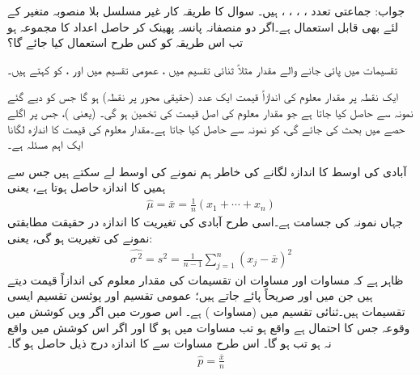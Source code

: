جواب:\quad
جماعتی تعدد ، ، ، ،  ہیں۔
\quad
سوال  کا طریقہ کار غیر مسلسل بلا منصوبہ متغیر کے لئے  بھی قابل استعمال ہے۔اگر دو منصفانہ پانسہ پھینک کر حاصل اعداد کا مجموعہ  ہو تب اس طریقہ کو کس طرح استعمال کیا جائے گا؟

تقسیمات میں پائی جانے والے مقدار مثلاً ثنائی تقسیم میں ، عمومی تقسیم میں  اور ، کو  کہتے ہیں۔

ایک نقطہ پر مقدار معلوم کی اندازاً قیمت  ایک عدد (حقیقی محور پر نقطہ) ہو گا جس کو دیے گئے نمونہ سے حاصل کیا جاتا ہے جو مقدار معلوم کی اصل قیمت کی تخمین ہو گی۔  (یعنی )، جس پر اگلے حصے میں بحث کی جائے گی،  کو نمونہ سے حاصل کیا جاتا ہے۔مقدار معلوم کی قیمت کا اندازہ لگانا ایک اہم مسئلہ ہے۔

آبادی کی اوسط   کا اندازہ لگانے کی خاطر ہم نمونے کی اوسط  لے سکتے ہیں جس سے ہمیں  کا اندازہ   حاصل ہوتا ہے، یعنی
\begin{align}\label{مساوات_شماریات_اندازہ_الف}
\widehat{\mu}=\bar{x}=\frac{1}{n}(x_1+\cdots+x_n)
\end{align}
جہاں نمونہ کی جسامت  ہے۔اسی طرح آبادی کی تغیریت کا اندازہ  در حقیقت مطابقتی نمونے کی تغیریت  ہو گی، یعنی:
\begin{align}\label{مساوات_شماریات_اندازہ_ب}
\widehat{\sigma^{\,2}}=s^2=\frac{1}{n-1}\sum_{j=1}^{n} (x_j-\bar{x})^2
\end{align}   
ظاہر ہے کہ مساوات  اور مساوات   ان تقسیمات کی مقدار معلوم کی اندازاً قیمت دیتے ہیں جن میں  اور  صریحاً پائے جاتے ہیں؛ عمومی تقسیم اور پوئسن تقسیم ایسی تقسیمات ہیں۔ثنائی تقسیم میں  (مساوات ) ہے۔ اس صورت میں  اگر  ویں کوشش میں وقوعہ  جس کا احتمال  ہے واقع ہو تب مساوات  میں  ہو گا اور اگر اس کوشش میں  واقع نہ ہو تب   ہو گا۔ اس طرح مساوات  سے  کا اندازہ درج ذیل حاصل ہو گا۔
\begin{align}
\widehat{p}=\frac{\bar{x}}{n}
\end{align}

